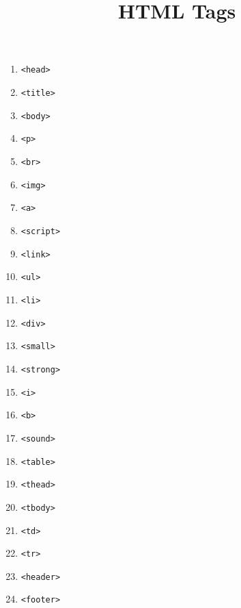 \documentclass{article}
\title{HTML Tags}
\date{}
\begin{document}
\maketitle
\begin{enumerate}
\item \texttt{<head>}
\item \texttt{<title>}
\item \texttt{<body>}
\item \texttt{<p>}
\item \texttt{<br>}
\item \texttt{<img>}
\item \texttt{<a>}
\item \texttt{<script>}
\item \texttt{<link>}
\item \texttt{<ul>}
\item \texttt{<li>}
\item \texttt{<div>}
\item \texttt{<small>}
\item \texttt{<strong>}
\item \texttt{<i>}
\item \texttt{<b>}
\item \texttt{<sound>}
\item \texttt{<table>}
\item \texttt{<thead>}
\item \texttt{<tbody>}
\item \texttt{<td>}
\item \texttt{<tr>}
\item \texttt{<header>}
\item \texttt{<footer>}
\end{enumerate}
\end{document}
